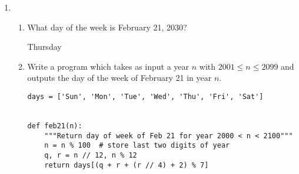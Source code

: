 \documentclass[10pt,twoside]{article}
\begin{document}
\begin{enumerate}[itemsep=2em,label=\Alph*.]
\begin{enumerate}[label=\arabic*.]
    \begin{comment}
    \begin{proof}[\textit{Alternative Proof}]
            Observe that
                \begin{align*}
                    (x-y)\sum_{i=0}^n x^i y^{n-i} &= \sum_{i=1}^{n+1}x^i y^{(n+1)-i} - \sum_{i=1}^{n+1} x^{(n+1)-i} y^i
                    \\&=\left(\sum_{i=1}^{n}x^i y^{(n+1)-i} +x^{n+1} \right) - \left( \sum_{i=1}^{n} x^{(n+1)-i}y^i + y^{n+1}\right)    
                    \\&=\left( x^{n+1} - y^{n+1}\right) + \left( \sum_{i=1}^n x^i y^{(n+1)-i}-\sum_{i=1}^{n} x^{(n+1)-i}y^i  \right)     
                    \\&=x^{n+1} - y^{n+1} + \sum_{i=1}^n (x^i y^{(n+1)-i} - x^{(n+1)-i} y^i )
                    \\&=x^{n+1} - y^{n+1} +0
                    \\&=x^{n+1} - y^{n+1}.
                \end{align*}
            \end{proof}
\end{comment}

    \end{enumerate}


\item

    \begin{enumerate}[label=\arabic*.]
        \item What day of the week is February 21, 2030?

            
            Thursday

        \item Write a program which takes as input a year $n$ with $2001 \leq n \leq 2099$ and outputs the day of the week of February 21 in year $n$.
            \vspace{1em}
            \begin{lstlisting}
days = ['Sun', 'Mon', 'Tue', 'Wed', 'Thu', 'Fri', 'Sat']


def feb21(n):
    """Return day of week of Feb 21 for year 2000 < n < 2100"""
    n = n % 100  # store last two digits of year
    q, r = n // 12, n % 12
    return days[(q + r + (r // 4) + 2) % 7]
            \end{lstlisting}

    \end{enumerate}
\end{enumerate}
\end{document}
